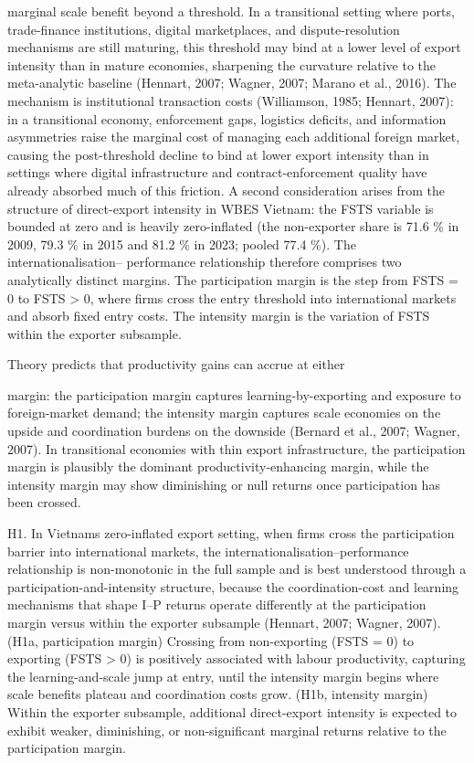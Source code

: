 \documentclass[12pt,a4paper]{article}
\begin{document}
marginal scale benefit beyond a threshold. In a transitional setting
where ports, trade-finance institutions, digital marketplaces, and
dispute-resolution mechanisms are still maturing, this threshold may
bind at a lower level of export intensity than in mature economies,
sharpening the curvature relative to the meta-analytic baseline
(Hennart, 2007; Wagner, 2007; Marano et al., 2016). The mechanism is
institutional transaction costs (Williamson, 1985; Hennart, 2007): in a
transitional economy, enforcement gaps, logistics deficits, and
information asymmetries raise the marginal cost of managing each
additional foreign market, causing the post-threshold decline to bind at
lower export intensity than in settings where digital infrastructure and
contract-enforcement quality have already absorbed much of this
friction. A second consideration arises from the structure of
direct-export intensity in WBES Vietnam: the FSTS variable is bounded at
zero and is heavily zero-inflated (the non-exporter share is 71.6 \% in
2009, 79.3 \% in 2015 and 81.2 \% in 2023; pooled 77.4 \%). The
internationalisation-- performance relationship therefore comprises two
analytically distinct margins. The participation margin is the step from
FSTS = 0 to FSTS \textgreater{} 0, where firms cross the entry threshold
into international markets and absorb fixed entry costs. The intensity
margin is the variation of FSTS within the exporter subsample.

Theory predicts that productivity gains can accrue at either

margin: the participation margin captures learning-by-exporting and
exposure to foreign-market demand; the intensity margin captures scale
economies on the upside and coordination burdens on the downside
(Bernard et al., 2007; Wagner, 2007). In transitional economies with
thin export infrastructure, the participation margin is plausibly the
dominant productivity-enhancing margin, while the intensity margin may
show diminishing or null returns once participation has been crossed.

H1. In Vietnam\textquotesingle s zero-inflated export setting, when
firms cross the participation barrier into international markets, the
internationalisation--performance relationship is non-monotonic in the
full sample and is best understood through a participation-and-intensity
structure, because the coordination-cost and learning mechanisms that
shape I--P returns operate differently at the participation margin
versus within the exporter subsample (Hennart, 2007; Wagner, 2007).
(H1a, participation margin) Crossing from non-exporting (FSTS = 0) to
exporting (FSTS \textgreater{} 0) is positively associated with labour
productivity, capturing the learning-and-scale jump at entry, until the
intensity margin begins where scale benefits plateau and coordination
costs grow. (H1b, intensity margin) Within the exporter subsample,
additional direct-export intensity is expected to exhibit weaker,
diminishing, or non-significant marginal returns relative to the
participation margin.
\end{document}
